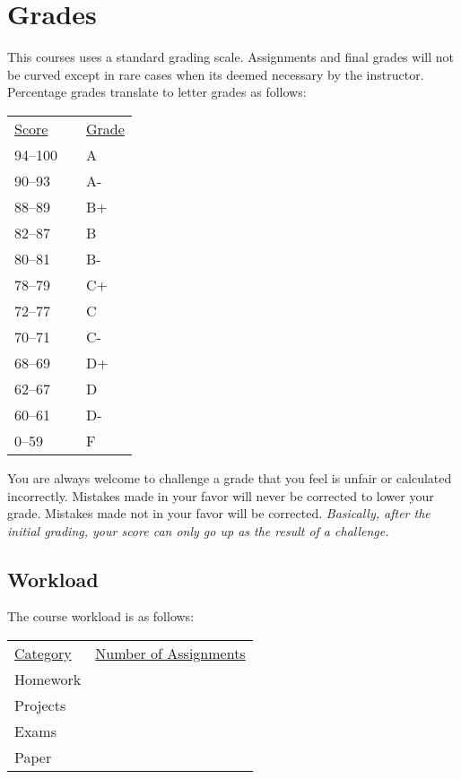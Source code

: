 \documentclass[10pt]{article}
\begin{document}
\section{Grades}

This courses uses a standard grading scale.  Assignments and final grades will not be curved except in rare cases when its deemed necessary by the instructor.  Percentage grades translate to letter grades as follows:

\begin{center}
\begin{small}
\begin{tabular}{lcl}
\underline{Score} & & \underline{Grade} \\
94--100 & & A \\
90--93 & & A- \\
88--89 & & B+ \\
82--87 & & B \\
80--81 & & B- \\
78--79 & & C+ \\
72--77 & & C \\
70--71 & & C- \\
68--69 & & D+ \\
62--67 & & D \\
60--61 & & D- \\
0--59 & & F
\end{tabular}
\end{small}
\end{center}


You are always welcome to challenge a grade that you feel is unfair or calculated incorrectly.  Mistakes made in your favor will never be corrected to lower your grade.  Mistakes made not in your favor will be corrected.  \textit{Basically, after the initial grading, your score can only go up as the result of a challenge.}

\subsection{Workload}

The course workload is as follows:
\begin{center}
  \begin{tabular}{ll}
    \underline{Category} & \underline{Number of Assignments} \\
    Homework &  \\
    Projects &  \\
    Exams & \\
    Paper &
  \end{tabular}
\end{center}
\end{document}
